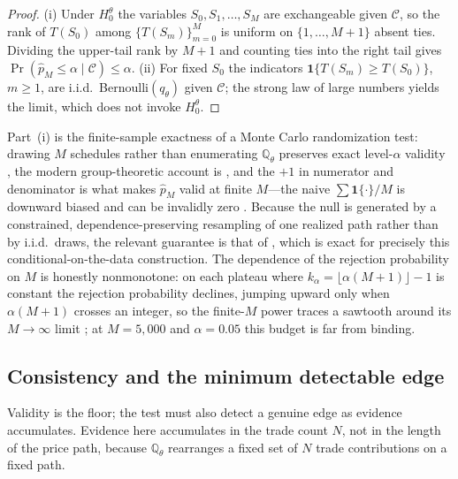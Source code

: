 \begin{proof}
(i) Under $H_0^\theta$ the variables $S_0,S_1,\dots,S_M$ are exchangeable given
$\mathcal C$, so the rank of $T(S_0)$ among $\{T(S_m)\}_{m=0}^{M}$ is uniform on
$\{1,\dots,M+1\}$ absent ties. Dividing the upper-tail rank by $M+1$ and counting
ties into the right tail gives $\Pr(\hat p_M\le\alpha\mid\mathcal
C)\le\alpha$. (ii) For fixed $S_0$ the indicators $\mathbf 1\{T(S_m)\ge
T(S_0)\}$, $m\ge1$, are i.i.d.\ Bernoulli$(q_\theta)$ given $\mathcal C$; the
strong law of large numbers yields the limit, which does not invoke $H_0^\theta$.
\end{proof}

Part~(i) is the finite-sample exactness of a Monte Carlo randomization test:
drawing $M$ schedules rather than enumerating $\mathbb{Q}_\theta$ preserves exact
level-$\alpha$ validity \cite{Dwass1957,Hope1968}, the modern group-theoretic
account is \cite{HemerikGoeman2018}, and the $+1$ in numerator and denominator is
what makes $\hat p_M$ valid at finite $M$---the naive $\sum\mathbf
1\{\cdot\}/M$ is downward biased and can be invalidly zero
\cite{PhipsonSmyth2010}. Because the null is generated by a constrained,
dependence-preserving resampling of one realized path rather than by i.i.d.\
draws, the relevant guarantee is that of \cite{BesagClifford1989}, which is exact
for precisely this conditional-on-the-data construction. The dependence of the
rejection probability on $M$ is honestly nonmonotone: on each plateau where
$k_\alpha=\lfloor\alpha(M+1)\rfloor-1$ is constant the rejection probability
declines, jumping upward only when $\alpha(M+1)$ crosses an integer, so the
finite-$M$ power traces a sawtooth around its $M\to\infty$ limit
\cite{Hope1968}; at $M=5{,}000$ and $\alpha=0.05$ this budget is far from binding.

\subsection{Consistency and the minimum detectable edge}

Validity is the floor; the test must also detect a genuine edge as evidence
accumulates. Evidence here accumulates in the trade count $N$, not in the length
of the price path, because $\mathbb{Q}_\theta$ rearranges a fixed set of $N$
trade contributions on a fixed path.

